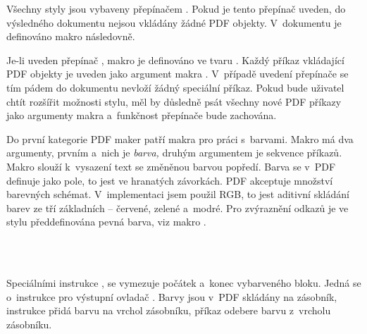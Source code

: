 \documentclass[12pt]{article}
\begin{document}
\medskip
Všechny styly jsou vybaveny přepínačem . 
Pokud je tento přepínač uveden, do výsledného
dokumentu nejsou vkládány žádné PDF objekty. V~dokumentu je definováno makro
 následovně.
\begin{flushleft}
\end{flushleft}
Je-li uveden přepínač , makro je definováno ve tvaru 
.
Každý příkaz vkládající PDF objekty je uveden jako argument makra 
. V~případě uvedení přepínače  se tím pádem
do dokumentu nevloží žádný speciální příkaz. Pokud bude uživatel chtít
rozšířit možnosti stylu, měl by důsledně psát všechny nové PDF příkazy
jako argumenty makra  a~funkčnost přepínače 
bude zachována.

\medskip
Do první kategorie PDF maker patří makra pro práci s~barvami. 
Makro  má dva argumenty, prvním a~nich je \emph{barva,}
druhým argumentem je sekvence příkazů. Makro slouží k~vysazení text se
změněnou barvou popředí. Barva se v~PDF definuje jako pole, to jest ve
hranatých závorkách. PDF akceptuje množství barevných schémat. V~implementaci
jsem použil RGB, to jest aditivní skládání barev ze tří základních 
-- červené, zelené a~modré. Pro zvýraznění odkazů je ve stylu předdefinována
pevná barva, viz makro . 
\begin{flushleft}%
 \\
 \\
\end{flushleft}
Speciálními instrukce ,  se vymezuje počátek a~konec
vybarveného bloku. Jedná se o~instrukce pro výstupní ovladač .
Barvy jsou v~PDF skládány na zásobník, instrukce  přidá barvu na 
vrchol zásobníku, příkaz  odebere barvu z~vrcholu zásobníku.
\end{document}
